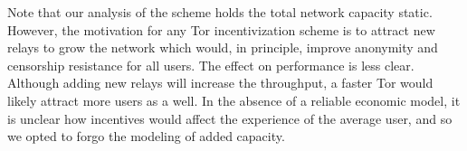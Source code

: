 Note that our analysis of the scheme holds the total network capacity static.
However, the motivation for any Tor incentivization scheme is to attract new
relays to grow the network which would, in principle, improve anonymity and
censorship resistance for all users. The effect on performance is less clear.
Although adding new relays will increase the throughput, a faster Tor would
likely attract more users as a well. In the absence of a reliable economic
model, it is unclear how incentives would affect the experience of the average
user, and so we opted to forgo the modeling of added capacity.


